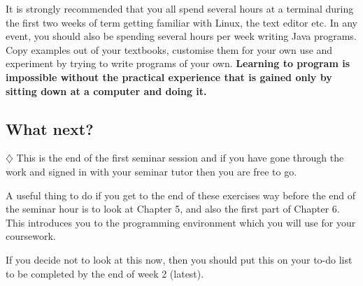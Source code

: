 It is strongly recommended that you all spend several hours at a
terminal during the first two weeks of term getting familiar with
Linux, the text editor etc. In any event, you should 
also be spending
several hours per week writing Java programs. Copy examples out
of your textbooks, customise them for your own use and experiment
by trying to write programs of your own. {\bf Learning to program is
impossible without the practical experience that is gained only by
sitting down at a computer and doing it.}

\subsection{What next?}

$\diamondsuit$
This is the end of the first seminar session and if you have gone through the 
work and signed in with your seminar tutor then you are free to go.

A useful thing to do if you get to the end of these exercises way before 
the end of the seminar hour is to look at Chapter 5, and also the first part of Chapter 6. 
This introduces you to the programming environment which you will use for 
your coursework. 
 
If you decide not to look at this now, then you should put this on your to-do
list to be completed by the end of week 2 (latest).
